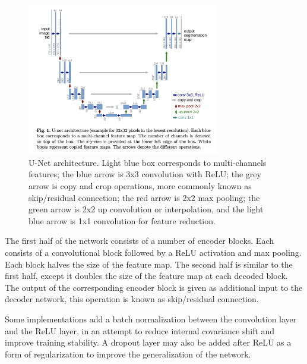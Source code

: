 \begin{figure}
    \centering
    \includegraphics[width=0.75\textwidth]{images/preliminary/unet_arch.png}
    \caption{U-Net architecture. Light blue box corresponds to multi-channels features; the blue arrow is 3x3 convolution with ReLU; the grey arrow is copy and crop operations, more commonly known as skip/residual connection; the red arrow is 2x2 max pooling; the green arrow is 2x2 up convolution or interpolation, and the light blue arrow is 1x1 convolution for feature reduction.\cite{ronnebergerUNetConvolutionalNetworks2015}} 
    \label{fig:unet_arch}
\end{figure}

The first half of the network consists of a number of encoder blocks. Each consists of a convolutional block followed by a ReLU activation and max pooling. Each block halves the size of the feature map. The second half is similar to the first half, except it doubles the size of the feature map at each decoded block. The output of the corresponding encoder block is given as additional input to the decoder network, this operation is known as skip/residual connection.

Some implementations add a batch normalization between the convolution layer and the ReLU layer, in an attempt to reduce internal covariance shift and improve training stability. A dropout layer may also be added after ReLU as a form of regularization to improve the generalization of the network.
